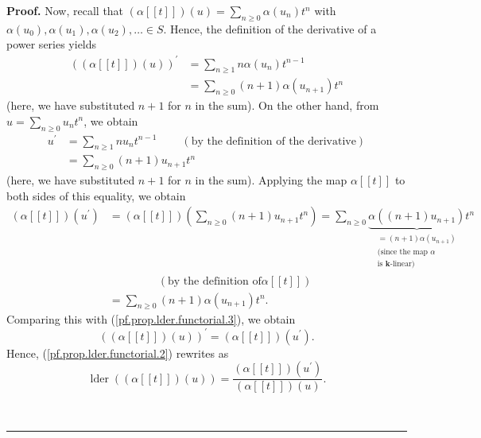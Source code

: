 \documentclass[numbers=enddot,12pt,final,onecolumn,notitlepage]{scrartcl}%
\theoremstyle{definition}
\newenvironment{proof}[1][Proof]{\noindent\textbf{#1.} }{\ \rule{0.5em}{0.5em}}
\let\sumnonlimits\sum
\renewcommand{\sum}{\sumnonlimits\limits}
\newenvironment{verlong}{}{}
\begin{document}
\begin{verlong}
\begin{proof}
Now, recall that $\left(  \alpha\left[  \left[  t\right]  \right]  \right)
\left(  u\right)  =\sum_{n\geq0}\alpha\left(  u_{n}\right)  t^{n}$ with
$\alpha\left(  u_{0}\right)  ,\alpha\left(  u_{1}\right)  ,\alpha\left(
u_{2}\right)  ,\ldots\in S$. Hence, the definition of the derivative of a
power series yields%
\begin{align}
\left(  \left(  \alpha\left[  \left[  t\right]  \right]  \right)  \left(
u\right)  \right)  ^{\prime}  &  =\sum_{n\geq1}n\alpha\left(  u_{n}\right)
t^{n-1}\nonumber\\
&  =\sum_{n\geq0}\left(  n+1\right)  \alpha\left(  u_{n+1}\right)  t^{n}
\label{pf.prop.lder.functorial.3}%
\end{align}
(here, we have substituted $n+1$ for $n$ in the sum). On the other hand, from
$u=\sum_{n\geq0}u_{n}t^{n}$, we obtain
\begin{align*}
u^{\prime}  &  =\sum_{n\geq1}nu_{n}t^{n-1}\ \ \ \ \ \ \ \ \ \ \left(  \text{by
the definition of the derivative}\right) \\
&  =\sum_{n\geq0}\left(  n+1\right)  u_{n+1}t^{n}%
\end{align*}
(here, we have substituted $n+1$ for $n$ in the sum). Applying the map
$\alpha\left[  \left[  t\right]  \right]  $ to both sides of this equality, we
obtain%
\begin{align*}
\left(  \alpha\left[  \left[  t\right]  \right]  \right)  \left(  u^{\prime
}\right)   &  =\left(  \alpha\left[  \left[  t\right]  \right]  \right)
\left(  \sum_{n\geq0}\left(  n+1\right)  u_{n+1}t^{n}\right)  =\sum_{n\geq
0}\underbrace{\alpha\left(  \left(  n+1\right)  u_{n+1}\right)  }%
_{\substack{=\left(  n+1\right)  \alpha\left(  u_{n+1}\right)  \\\text{(since
the map }\alpha\\\text{is }\mathbf{k}\text{-linear)}}}t^{n}\\
&  \ \ \ \ \ \ \ \ \ \ \ \ \ \ \ \ \ \ \ \ \left(  \text{by the definition of
}\alpha\left[  \left[  t\right]  \right]  \right) \\
&  =\sum_{n\geq0}\left(  n+1\right)  \alpha\left(  u_{n+1}\right)  t^{n}.
\end{align*}
Comparing this with (\ref{pf.prop.lder.functorial.3}), we obtain%
\[
\left(  \left(  \alpha\left[  \left[  t\right]  \right]  \right)  \left(
u\right)  \right)  ^{\prime}=\left(  \alpha\left[  \left[  t\right]  \right]
\right)  \left(  u^{\prime}\right)  .
\]
Hence, (\ref{pf.prop.lder.functorial.2}) rewrites as%
\begin{equation}
\operatorname*{lder}\left(  \left(  \alpha\left[  \left[  t\right]  \right]
\right)  \left(  u\right)  \right)  =\dfrac{\left(  \alpha\left[  \left[
t\right]  \right]  \right)  \left(  u^{\prime}\right)  }{\left(  \alpha\left[
\left[  t\right]  \right]  \right)  \left(  u\right)  }.
\label{pf.prop.lder.functorial.6}%
\end{equation}



\end{proof}
\end{verlong}
\end{document}
